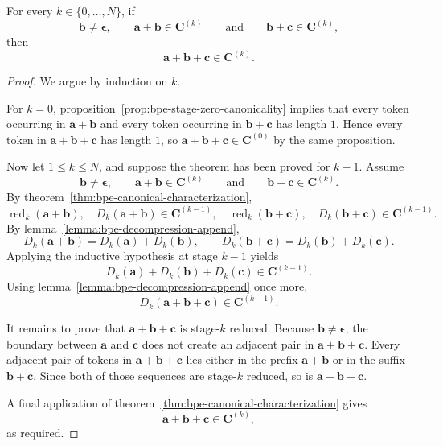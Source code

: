 \begin{theorem}
    \label{thm:bpe-overlap-concatenation}
    For every $k \in \{0,\ldots,N\}$, if
    \[
    \mathbf{b} \neq \boldsymbol{\epsilon},
    \qquad
    \mathbf{a}+\mathbf{b} \in \mathbf{C}^{(k)}
    \qquad\text{and}\qquad
    \mathbf{b}+\mathbf{c} \in \mathbf{C}^{(k)},
    \]
    then
    \[
    \mathbf{a}+\mathbf{b}+\mathbf{c} \in \mathbf{C}^{(k)}.
    \]
\end{theorem}
\begin{proof}
    We argue by induction on $k$.

    For $k=0$, proposition~\ref{prop:bpe-stage-zero-canonicality} implies that every token
    occurring in $\mathbf{a}+\mathbf{b}$ and every token occurring in $\mathbf{b}+\mathbf{c}$
    has length $1$. Hence every token in $\mathbf{a}+\mathbf{b}+\mathbf{c}$ has length $1$,
    so $\mathbf{a}+\mathbf{b}+\mathbf{c} \in \mathbf{C}^{(0)}$ by the same proposition.

    Now let $1 \leq k \leq N$, and suppose the theorem has been proved for $k-1$.
    Assume
    \[
    \mathbf{b} \neq \boldsymbol{\epsilon},
    \qquad
    \mathbf{a}+\mathbf{b} \in \mathbf{C}^{(k)}
    \qquad\text{and}\qquad
    \mathbf{b}+\mathbf{c} \in \mathbf{C}^{(k)}.
    \]
    By theorem~\ref{thm:bpe-canonical-characterization},
    \[
    \operatorname{red}_k(\mathbf{a}+\mathbf{b}),
    \quad
    D_k(\mathbf{a}+\mathbf{b}) \in \mathbf{C}^{(k-1)},
    \quad
    \operatorname{red}_k(\mathbf{b}+\mathbf{c}),
    \quad
    D_k(\mathbf{b}+\mathbf{c}) \in \mathbf{C}^{(k-1)}.
    \]
    By lemma~\ref{lemma:bpe-decompression-append},
    \[
    D_k(\mathbf{a}+\mathbf{b}) = D_k(\mathbf{a}) + D_k(\mathbf{b}),
    \qquad
    D_k(\mathbf{b}+\mathbf{c}) = D_k(\mathbf{b}) + D_k(\mathbf{c}).
    \]
    Applying the inductive hypothesis at stage $k-1$ yields
    \[
    D_k(\mathbf{a}) + D_k(\mathbf{b}) + D_k(\mathbf{c}) \in \mathbf{C}^{(k-1)}.
    \]
    Using lemma~\ref{lemma:bpe-decompression-append} once more,
    \[
    D_k(\mathbf{a}+\mathbf{b}+\mathbf{c}) \in \mathbf{C}^{(k-1)}.
    \]

    It remains to prove that $\mathbf{a}+\mathbf{b}+\mathbf{c}$ is stage-$k$ reduced.
    Because $\mathbf{b} \neq \boldsymbol{\epsilon}$, the boundary between $\mathbf{a}$ and $\mathbf{c}$
    does not create an adjacent pair in $\mathbf{a}+\mathbf{b}+\mathbf{c}$.
    Every adjacent pair of tokens in $\mathbf{a}+\mathbf{b}+\mathbf{c}$ lies either in the prefix
    $\mathbf{a}+\mathbf{b}$ or in the suffix $\mathbf{b}+\mathbf{c}$.
    Since both of those sequences are stage-$k$ reduced, so is $\mathbf{a}+\mathbf{b}+\mathbf{c}$.

    A final application of theorem~\ref{thm:bpe-canonical-characterization} gives
    \[
    \mathbf{a}+\mathbf{b}+\mathbf{c} \in \mathbf{C}^{(k)},
    \]
    as required.
\end{proof}

